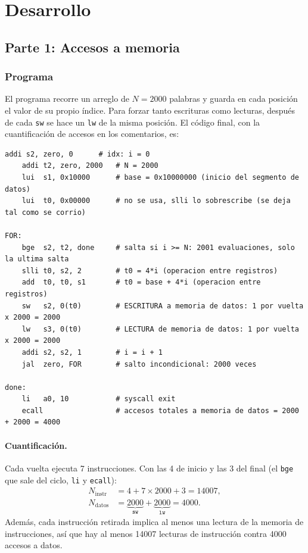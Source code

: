 \documentclass[11pt,a4paper]{article}
\begin{document}
\section{Desarrollo}

\subsection{Parte 1: Accesos a memoria}
\label{sec:parte1}

\subsubsection{Programa}

El programa recorre un arreglo de $N=2000$ palabras y guarda en cada posici\'on
el valor de su propio \'indice. Para forzar tanto escrituras como lecturas,
despu\'es de cada \texttt{sw} se hace un \texttt{lw} de la misma posici\'on. El
c\'odigo final, con la cuantificaci\'on de accesos en los comentarios, es:

\begin{lstlisting}[style=asm,caption={Programa de accesos a memoria (versi\'on para el procesador con hazard unit).},label={lst:original}]
    addi s2, zero, 0      # idx: i = 0
    addi t2, zero, 2000   # N = 2000
    lui  s1, 0x10000      # base = 0x10000000 (inicio del segmento de datos)
    lui  t0, 0x00000      # no se usa, slli lo sobrescribe (se deja tal como se corrio)

FOR:
    bge  s2, t2, done     # salta si i >= N: 2001 evaluaciones, solo la ultima salta
    slli t0, s2, 2        # t0 = 4*i (operacion entre registros)
    add  t0, t0, s1       # t0 = base + 4*i (operacion entre registros)
    sw   s2, 0(t0)        # ESCRITURA a memoria de datos: 1 por vuelta x 2000 = 2000
    lw   s3, 0(t0)        # LECTURA de memoria de datos: 1 por vuelta x 2000 = 2000
    addi s2, s2, 1        # i = i + 1
    jal  zero, FOR        # salto incondicional: 2000 veces

done:
    li   a0, 10           # syscall exit
    ecall                 # accesos totales a memoria de datos = 2000 + 2000 = 4000
\end{lstlisting}

\paragraph{Cuantificaci\'on.}
Cada vuelta ejecuta 7 instrucciones. Con las 4 de inicio y las 3 del final (el
\texttt{bge} que sale del ciclo, \texttt{li} y \texttt{ecall}):
\begin{align}
  N_{\text{instr}} &= 4 + 7 \times 2000 + 3 = 14007, \\
  N_{\text{datos}} &= \underbrace{2000}_{\texttt{sw}} + \underbrace{2000}_{\texttt{lw}} = 4000 .
\end{align}
Adem\'as, cada instrucci\'on retirada implica al menos una lectura de la
memoria de instrucciones, as\'i que hay al menos 14007 lecturas de instrucci\'on
contra 4000 accesos a datos.
\end{document}
